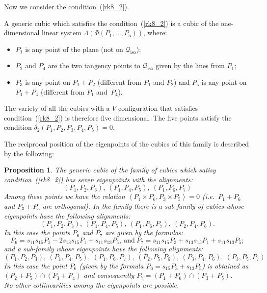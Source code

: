 \documentclass{amsart}
\theoremstyle{plain}
\newtheorem{prop}[lemma]{Proposition}
\theoremstyle{definition}
\newcommand{\iso}{\mathcal{Q}_{\mathrm{iso}}}
\newcommand{\scl}[2]{\left\langle {#1}, {#2} \right\rangle}
\begin{document}
Now we consider the condition~(\ref{rk8_2}).

%
A generic cubic which satisfies the condition~(\ref{rk8_2}) is
a cubic of the one-dimensional linear system
$\Lambda(\Phi(P_1, \dotsc, P_5))$, where:
\begin{itemize}
\item $P_1$ is any point of the plane (not on $\iso$);
\item $P_2$ and $P_4$ are the two tangency points to $\iso$ given by the lines
from $P_1$;
\item $P_3$ is any point on $P_1+P_2$ (different from $P_1$ and $P_2$)
and $P_5$ is any point on $P_1+P_4$ (different from $P_1$ and~$P_4$).
\end{itemize}

The variety of all the cubics with a $V$-configuration
that
satisfies condition~(\ref{rk8_2}) is therefore five dimensional.
The five points satisfy the condition $\delta_2(P_1, P_2, P_3, P_4, P_5) = 0$.


The reciprocal position of the eigenpoints of the cubics of this family
is described by the following:
%
\begin{prop}
\label{prop:rk8_2B}
The generic cubic of the family of cubics which satisy condition~(\ref{rk8_2})
has seven eigenpoints with the alignments:
\[
(P_1, P_2, P_3), \ (P_1, P_4, P_5), \ (P_1, P_6, P_7)
\]
Among these points we have the relation
$\scl{P_1 \times P_6}{P_3\times P_5}=0$
(i.e.\ $P_1+P_6$ and $P_3+P_5$ are orthogonal).
In the family there is a sub-family of cubics
whose eigenpoints have the following
alignments:
\[
(P_1, P_2, P_3),\ (P_1, P_4, P_5),\ (P_1, P_6, P_7),\ (P_2, P_4, P_6).
\]
In this case the points $P_6$ and $P_7$ are given by the formulas:
\[P_6 = s_{11}s_{15}P_3-2s_{13}s_{15}P_1+s_{11}s_{13}P_5, \ \mbox{and} \
P_7 = s_{11}s_{15}P_3+s_{13}s_{15}P_1+s_{11}s_{13}P_5;
\]
and a sub-family whose eigenpoints have the following
alignments:
\[
(P_1, P_2, P_3),\ (P_1, P_4, P_5), \ (P_1, P_6, P_7),\ (P_2, P_5, P_6),\
(P_3, P_4, P_6),\ (P_3, P_5, P_7)
\]
In this case the point $P_6$ (given by the formula
$P_6 = s_{15}P_3+s_{13}P_5$) is obtained as
$(P_2+P_5) \cap (P_3+P_4)$ and consequently
$P_7 = (P_1+P_6) \cap (P_3+P_5)$.\\
No other collinearities among the eigenpoints are possible.
\end{prop}
\end{document}
